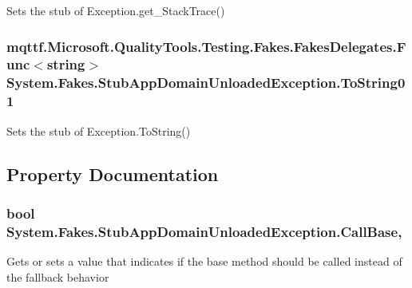 Sets the stub of Exception.\-get\-\_\-\-Stack\-Trace()

\hypertarget{class_system_1_1_fakes_1_1_stub_app_domain_unloaded_exception_a9db990984e80719bcb6eb622b67708e7}{
\subsubsection[{To\-String01}]{\setlength{\rightskip}{0pt plus 5cm}mqttf.\-Microsoft.\-Quality\-Tools.\-Testing.\-Fakes.\-Fakes\-Delegates.\-Func$<$string$>$ System.\-Fakes.\-Stub\-App\-Domain\-Unloaded\-Exception.\-To\-String01}}\label{class_system_1_1_fakes_1_1_stub_app_domain_unloaded_exception_a9db990984e80719bcb6eb622b67708e7}


Sets the stub of Exception.\-To\-String()



\subsection{Property Documentation}
\hypertarget{class_system_1_1_fakes_1_1_stub_app_domain_unloaded_exception_aa9b1184855699bdd3e70de7157610932}{
\subsubsection[{Call\-Base}]{\setlength{\rightskip}{0pt plus 5cm}bool System.\-Fakes.\-Stub\-App\-Domain\-Unloaded\-Exception.\-Call\-Base\hspace{0.3cm}{\ttfamily [get]}, {\ttfamily [set]}}}\label{class_system_1_1_fakes_1_1_stub_app_domain_unloaded_exception_aa9b1184855699bdd3e70de7157610932}


Gets or sets a value that indicates if the base method should be called instead of the fallback behavior

